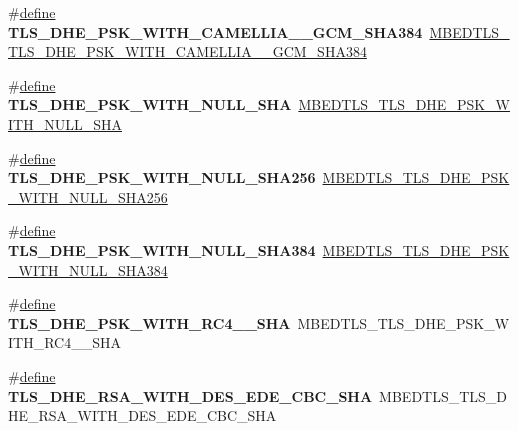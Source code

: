 \begin{DoxyCompactItemize}
\#\hyperlink{structdefine}{define} {\bfseries T\+L\+S\+\_\+\+D\+H\+E\+\_\+\+P\+S\+K\+\_\+\+W\+I\+T\+H\+\_\+\+C\+A\+M\+E\+L\+L\+I\+A\+\_\+\_\+\+G\+C\+M\+\_\+\+S\+H\+A384}~\hyperlink{ssl__ciphersuites_8h_a2b86788e1428d40e77e787c4c42146d4}{M\+B\+E\+D\+T\+L\+S\+\_\+\+T\+L\+S\+\_\+\+D\+H\+E\+\_\+\+P\+S\+K\+\_\+\+W\+I\+T\+H\+\_\+\+C\+A\+M\+E\+L\+L\+I\+A\+\_\+\_\+\+G\+C\+M\+\_\+\+S\+H\+A384}
\item 
\mbox{\label{compat-1_83_8h_a5da1692031a54d9f9b94ca90e6c5cc7f}} 
\#\hyperlink{structdefine}{define} {\bfseries T\+L\+S\+\_\+\+D\+H\+E\+\_\+\+P\+S\+K\+\_\+\+W\+I\+T\+H\+\_\+\+N\+U\+L\+L\+\_\+\+S\+HA}~\hyperlink{ssl__ciphersuites_8h_a81f07914d0180154bd3c81846a4e3fb4}{M\+B\+E\+D\+T\+L\+S\+\_\+\+T\+L\+S\+\_\+\+D\+H\+E\+\_\+\+P\+S\+K\+\_\+\+W\+I\+T\+H\+\_\+\+N\+U\+L\+L\+\_\+\+S\+HA}
\item 
\mbox{\label{compat-1_83_8h_a743784f911cb5e8629671cdcb26d0b94}} 
\#\hyperlink{structdefine}{define} {\bfseries T\+L\+S\+\_\+\+D\+H\+E\+\_\+\+P\+S\+K\+\_\+\+W\+I\+T\+H\+\_\+\+N\+U\+L\+L\+\_\+\+S\+H\+A256}~\hyperlink{ssl__ciphersuites_8h_a7c208c375741c2b6c25f09c78bf03551}{M\+B\+E\+D\+T\+L\+S\+\_\+\+T\+L\+S\+\_\+\+D\+H\+E\+\_\+\+P\+S\+K\+\_\+\+W\+I\+T\+H\+\_\+\+N\+U\+L\+L\+\_\+\+S\+H\+A256}
\item 
\mbox{\label{compat-1_83_8h_af4cb89c1b228da32eba92c1e40ec6ad3}} 
\#\hyperlink{structdefine}{define} {\bfseries T\+L\+S\+\_\+\+D\+H\+E\+\_\+\+P\+S\+K\+\_\+\+W\+I\+T\+H\+\_\+\+N\+U\+L\+L\+\_\+\+S\+H\+A384}~\hyperlink{ssl__ciphersuites_8h_a994c1e5eeb9faf326e80180a4e501c7a}{M\+B\+E\+D\+T\+L\+S\+\_\+\+T\+L\+S\+\_\+\+D\+H\+E\+\_\+\+P\+S\+K\+\_\+\+W\+I\+T\+H\+\_\+\+N\+U\+L\+L\+\_\+\+S\+H\+A384}
\item 
\mbox{\label{compat-1_83_8h_a54b5b4dd81ed99205bccb629048e74e4}} 
\#\hyperlink{structdefine}{define} {\bfseries T\+L\+S\+\_\+\+D\+H\+E\+\_\+\+P\+S\+K\+\_\+\+W\+I\+T\+H\+\_\+\+R\+C4\+\_\+\_\+\+S\+HA}~M\+B\+E\+D\+T\+L\+S\+\_\+\+T\+L\+S\+\_\+\+D\+H\+E\+\_\+\+P\+S\+K\+\_\+\+W\+I\+T\+H\+\_\+\+R\+C4\+\_\+\_\+\+S\+HA
\item 
\mbox{\label{compat-1_83_8h_a067a9a52266f1e6505ec90a36f0c4fd6}} 
\#\hyperlink{structdefine}{define} {\bfseries T\+L\+S\+\_\+\+D\+H\+E\+\_\+\+R\+S\+A\+\_\+\+W\+I\+T\+H\+\_\+D\+E\+S\+\_\+\+E\+D\+E\+\_\+\+C\+B\+C\+\_\+\+S\+HA}~M\+B\+E\+D\+T\+L\+S\+\_\+\+T\+L\+S\+\_\+\+D\+H\+E\+\_\+\+R\+S\+A\+\_\+\+W\+I\+T\+H\+\_\+D\+E\+S\+\_\+\+E\+D\+E\+\_\+\+C\+B\+C\+\_\+\+S\+HA

\end{DoxyCompactItemize}
